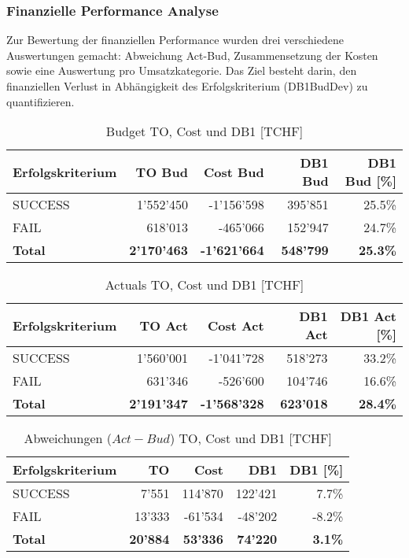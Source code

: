\subsubsection{Finanzielle Performance Analyse}
Zur Bewertung der finanziellen Performance wurden drei verschiedene Auswertungen gemacht: Abweichung Act-Bud, Zusammensetzung der Kosten sowie eine Auswertung pro Umsatzkategorie. Das Ziel besteht darin, den finanziellen Verlust in Abhängigkeit des Erfolgskriterium (DB1BudDev) zu quantifizieren. 
\begin{table}[H]
	\centering
	\caption{Budget TO, Cost und DB1 [TCHF]}
	\begin{tabular}{lrrrr}
		\textbf{Erfolgskriterium} & \textbf{TO Bud} & \textbf{Cost Bud} &
		\textbf{DB1 Bud} & \textbf{DB1 Bud [\%]} \\\hline
	SUCCESS & 1'552'450 & -1'156'598 & 395'851 & 25.5\% \\
	FAIL  & 618'013 & -465'066 & 152'947 & 24.7\% \\\hline
	\textbf{Total} & \textbf{2'170'463} & \textbf{-1'621'664} & \textbf{548'799} & \textbf{25.3\%}\\
	\end{tabular}%
\label{bud}%
\end{table}%
\begin{table}[H]
	\centering
	\caption{Actuals TO, Cost und DB1 [TCHF]}
	\begin{tabular}{lrrrr}
		\textbf{Erfolgskriterium} & \textbf{TO Act} & \textbf{Cost Act} & \textbf{DB1 Act}&
		\textbf{DB1 Act [\%]} \\\hline
			SUCCESS & 1'560'001 & -1'041'728 & 518'273 & 33.2\% \\
			FAIL  & 631'346 & -526'600 & 104'746 & 16.6\% \\\hline
			\textbf{Total} & \textbf{2'191'347} & \textbf{-1'568'328} & \textbf{623'018} & \textbf{28.4\%} \\
	\end{tabular}
\label{act}%
\end{table}%
\begin{table}[H]
\centering
\caption{Abweichungen ($Act-Bud$) TO, Cost und DB1 [TCHF] }
\begin{tabular}{lrrrr}
	\textbf{Erfolgskriterium} & \textbf{TO} & \textbf{Cost} & \textbf{DB1}&
	\textbf{DB1 [\%]} \\\hline
	SUCCESS & 7'551 & 114'870 & 122'421 & 7.7\% \\
	FAIL  & 13'333 & -61'534 & -48'202 & -8.2\% \\\hline
	\textbf{Total} & \textbf{20'884} & \textbf{53'336} & \textbf{74'220} & \textbf{3.1\%} \\
\end{tabular}
\label{Abw}%
\end{table}%
